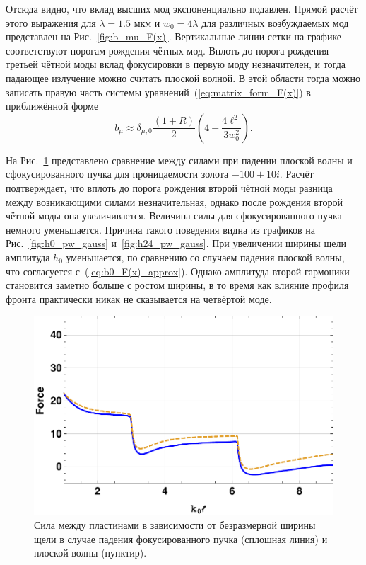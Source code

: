Отсюда видно, что вклад высших мод экспоненциально подавлен. Прямой расчёт этого выражения для $\lambda = 1.5$ мкм и $w_0 = 4 \lambda$ для различных возбуждаемых мод представлен на Рис.~\ref{fig:b_mu_F(x)}. Вертикальные линии сетки на графике соответствуют порогам рождения чётных мод. Вплоть до порога рождения третьей чётной моды вклад фокусировки в первую моду незначителен, и тогда падающее излучение можно считать плоской волной. В этой области тогда можно записать правую часть системы уравнений~(\ref{eq:matrix_form_F(x)}) в приближённой форме
\begin{equation}
    b_\mu \approx \delta_{\mu,0}\frac{(1+R)}{2}(4 - \frac{4 \ell^2}{3 w_0^2}).
    \label{eq:b0_F(x)_approx}
\end{equation}

На Рис.~\ref{fig:Force_PW_Gauss_100_10} представлено сравнение между силами при падении плоской волны и сфокусированного пучка для проницаемости золота $-100 + 10i$. Расчёт подтверждает, что вплоть до порога рождения второй чётной моды разница между возникающими силами незначительная, однако после рождения второй чётной моды она увеличивается. Величина силы для сфокусированного пучка немного уменьшается. Причина такого поведения видна из графиков на Рис.~\ref{fig:h0_pw_gauss} и~\ref{fig:h24_pw_gauss}. При увеличении ширины щели амплитуда $h_0$ уменьшается, по сравнению со случаем падения плоской волны, что согласуется с~(\ref{eq:b0_F(x)_approx}). Однако амплитуда второй гармоники становится заметно больше с ростом ширины, в то время как влияние профиля фронта практически никак не сказывается на четвёртой моде.
\begin{figure}
    \centering
    \includegraphics[width=\textwidth]{figures/Force_PW_GAUSS.pdf}
    \caption{Сила между пластинами в зависимости от безразмерной ширины щели в случае падения фокусированного пучка (сплошная линия) и плоской волны (пунктир).}
    \label{fig:Force_PW_Gauss_100_10}
\end{figure}

